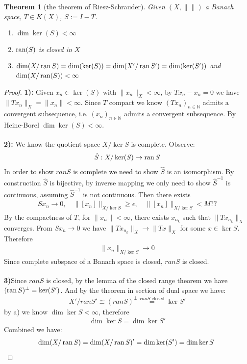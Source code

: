 \documentclass[a4paper,11pt,fleqn]{book}
\newtheorem{theorem}{Theorem}[section]
\theoremstyle{definition}
\theoremstyle{remark}
\begin{document}
\begin{theorem}[the theorem of Riesz-Schrauder]\quad
Given $(X, \|\|)$ a Banach space, $T \in K(X)$, $S:= I - T$.
\begin{enumerate}
	\item $\dim\ker(S) < \infty$ 
	\item $\operatorname{ran}(S)$ is closed in $X$ 
	\item $\dim(X\slash \operatorname{ran} S) = \dim(\ker(S)) = \dim(X'\slash \operatorname{ran} S') = \dim(\ker(S'))$ and $\dim(X\slash \operatorname{ran}(S))< \infty$
\end{enumerate}
\end{theorem}
\begin{proof}
\textbf{1):} Given $x_n \in \ker(S)$ with $\|x_n\|_X < \infty$, by $Tx_n - x_n = 0$ we have $\|Tx_n\|_X = \|x_n\| < \infty$. Since $T$ compact we know $(Tx_n)_{n \in \mathbb{N}}$ admits a convergent subsequence, i.e. $(x_n)_{n \in \mathbb{N}}$ admits a convergent subsequence. By Heine-Borel $\dim \ker(S) < \infty$.\\\\
\textbf{2):} We know the quotient space $X\slash \ker S$ is complete. Observe:
\begin{align*}
	\hat{S}: X\slash \ker(S) \rightarrow \operatorname{ran} S
\end{align*}
In order to show $ran S$ is complete we need to show $\hat{S}$ is an isomorphism. By construction $\hat{S}$ is bijective, by inverse mapping we only need to show $\hat{S}^{-1}$ is continuous, assuming $\hat{S}^{-1}$ is not continuous. Then there exists
\begin{align*}
	Sx_n \rightarrow 0, \quad \|[x_n]\|_{X\slash \ker S} \geq \epsilon,\quad \|[x_n]\|_{X\slash \ker S} < M  ??
\end{align*}
	By the compactness of $T$, for $\|x_n\|< \infty$, there exists $x_{n_k}$ such that $\|T x_{n_k}\|_X $ converges. From $Sx_n \rightarrow 0$ we have $\|T x_{n_k}\|_X \rightarrow \|Tx\|_X$ for some $x \in \ker S$. Therefore
\begin{align*}
	\|x_n\|_{X\slash \ker S} \rightarrow 0
\end{align*}
Since complete subspace of a Banach space is closed, $ran S$ is closed.\\
\\
\textbf{3)}Since $ran S$ is closed, by the lemma of the closed range theorem we have $(\operatorname{ran} S)^\perp = \ker(S')$.
And by the theorem in section of dual space we have:
\begin{align*}
	X'\slash ranS' \cong (ranS)^\perp \overset{ranS\text{ closed}}{=} \ker S'
\end{align*}
by a) we know $\dim \ker S < \infty$, therefore
\begin{align*}
	\dim \ker S = \dim \ker S'
\end{align*}
Combined we have:
\begin{align*}
	\dim (X\slash \operatorname{ran} S) = \dim (X\slash \operatorname{ran} S)' = \dim \ker( S') = \dim \ker S \
\end{align*}
\end{proof}
\end{document}
